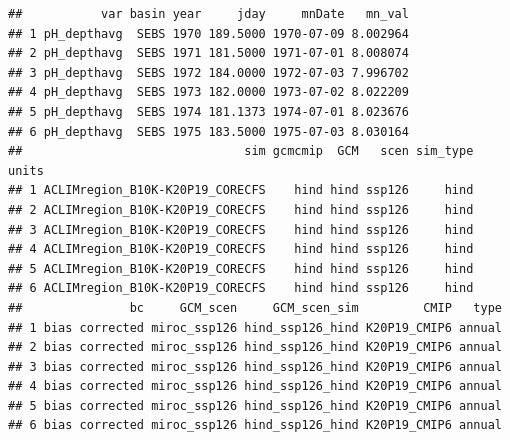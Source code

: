 \documentclass[
]{article}
\newenvironment{Shaded}{\begin{snugshade}}{\end{snugshade}}
\newcommand{\AttributeTok}[1]{\textcolor[rgb]{0.77,0.63,0.00}{#1}}
\newcommand{\CommentTok}[1]{\textcolor[rgb]{0.56,0.35,0.01}{\textit{#1}}}
\newcommand{\DecValTok}[1]{\textcolor[rgb]{0.00,0.00,0.81}{#1}}
\newcommand{\FunctionTok}[1]{\textcolor[rgb]{0.00,0.00,0.00}{#1}}
\newcommand{\NormalTok}[1]{#1}
\newcommand{\OtherTok}[1]{\textcolor[rgb]{0.56,0.35,0.01}{#1}}
\newcommand{\SpecialCharTok}[1]{\textcolor[rgb]{0.00,0.00,0.00}{#1}}
\newcommand{\StringTok}[1]{\textcolor[rgb]{0.31,0.60,0.02}{#1}}
\begin{document}
\begin{Shaded}
\end{Shaded}

\begin{verbatim}
##           var basin year     jday     mnDate   mn_val
## 1 pH_depthavg  SEBS 1970 189.5000 1970-07-09 8.002964
## 2 pH_depthavg  SEBS 1971 181.5000 1971-07-01 8.008074
## 3 pH_depthavg  SEBS 1972 184.0000 1972-07-03 7.996702
## 4 pH_depthavg  SEBS 1973 182.0000 1973-07-02 8.022209
## 5 pH_depthavg  SEBS 1974 181.1373 1974-07-01 8.023676
## 6 pH_depthavg  SEBS 1975 183.5000 1975-07-03 8.030164
##                               sim gcmcmip  GCM   scen sim_type units
## 1 ACLIMregion_B10K-K20P19_CORECFS    hind hind ssp126     hind      
## 2 ACLIMregion_B10K-K20P19_CORECFS    hind hind ssp126     hind      
## 3 ACLIMregion_B10K-K20P19_CORECFS    hind hind ssp126     hind      
## 4 ACLIMregion_B10K-K20P19_CORECFS    hind hind ssp126     hind      
## 5 ACLIMregion_B10K-K20P19_CORECFS    hind hind ssp126     hind      
## 6 ACLIMregion_B10K-K20P19_CORECFS    hind hind ssp126     hind      
##               bc     GCM_scen     GCM_scen_sim         CMIP   type
## 1 bias corrected miroc_ssp126 hind_ssp126_hind K20P19_CMIP6 annual
## 2 bias corrected miroc_ssp126 hind_ssp126_hind K20P19_CMIP6 annual
## 3 bias corrected miroc_ssp126 hind_ssp126_hind K20P19_CMIP6 annual
## 4 bias corrected miroc_ssp126 hind_ssp126_hind K20P19_CMIP6 annual
## 5 bias corrected miroc_ssp126 hind_ssp126_hind K20P19_CMIP6 annual
## 6 bias corrected miroc_ssp126 hind_ssp126_hind K20P19_CMIP6 annual
\end{verbatim}
\end{document}
